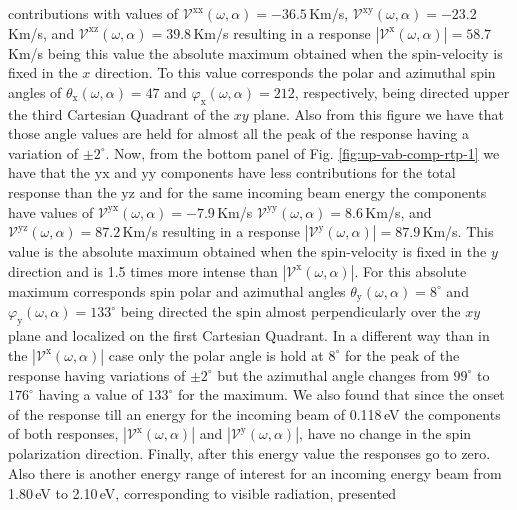 \documentclass[prb,11pt,tightenlines,twocolumn,aps]{revtex4-1}
\begin{document}
contributions with values of
% 
$\mathcal{V}^{\mathrm{xx}}(\omega,\alpha)=-36.5$\,Km/s,
$\mathcal{V}^{\mathrm{xy}}(\omega,\alpha)=-23.2$\,Km/s, and
$\mathcal{V}^{\mathrm{xz}}(\omega,\alpha)= 39.8$\,Km/s resulting in a response
$|\mathcal{V}^{\mathrm{x}}(\omega,\alpha)|=58.7$\,Km/s being this value the
absolute maximum obtained when the spin-velocity is fixed in the $x$ direction.
% 
To this value corresponds the polar and azimuthal spin
angles of $\theta_{\mathrm{x}}(\omega,\alpha)=47$ and
$\varphi_{\mathrm{x}}(\omega,\alpha)=212$, respectively, being directed upper
the third Cartesian Quadrant of the $xy$ plane. Also from this figure we have
that those angle values are held for almost all the peak of the response having
a variation of $\pm 2^{\circ}$.
% 
Now, from the bottom panel of Fig. \ref{fig:up-vab-comp-rtp-1} we have that the
$\mathrm{yx}$ and $\mathrm{yy}$ components have less contributions for the total
response than the $\mathrm{yz}$ and for the same incoming beam energy the components have values of
% 
$\mathcal{V}^{\mathrm{yx}}(\omega,\alpha)= -7.9$\,Km/s 
$\mathcal{V}^{\mathrm{yy}}(\omega,\alpha)=  8.6$\,Km/s, and
$\mathcal{V}^{\mathrm{yz}}(\omega,\alpha)= 87.2$\,Km/s 
% 
resulting in a response $|\mathcal{V}^{\mathrm{y}}(\omega,\alpha)|=87.9$\,Km/s.
This value is the absolute maximum obtained when the spin-velocity is fixed in
the $y$ direction and is 1.5 times more intense than
$|\mathcal{V}^{\mathrm{x}}(\omega,\alpha)|$. For this absolute maximum
corresponds spin polar and azimuthal angles $\theta_{\mathrm{y}}(\omega,\alpha)
= 8^{\circ}$ and $\varphi_{\mathrm{y}}(\omega,\alpha) = 133^{\circ}$ being
directed the spin almost perpendicularly over the $xy$ plane and  localized on
the first Cartesian Quadrant. 
% 
In a different way than in the $|\mathcal{V}^{\mathrm{x}}(\omega,\alpha)|$ case
only the polar angle is hold at $8^{\circ}$ for the peak of the response having
variations of $\pm 2^{\circ}$ but the azimuthal angle changes from $99^{\circ}$
to $176^{\circ}$ having a value of $133^{\circ}$ for the maximum.
% 
We also found that since the onset of the response till an energy for the
incoming beam of 0.118\,eV the components of both responses,
$|\mathcal{V}^{\mathrm{x}}(\omega,\alpha)|$ and
$|\mathcal{V}^{\mathrm{y}}(\omega,\alpha)|$, have no change in the spin
polarization direction. Finally, after this energy value the responses go to
zero.
Also there is another energy range of interest for an incoming energy beam from
1.80\,eV to 2.10\,eV, corresponding to visible radiation, presented
\end{document}
